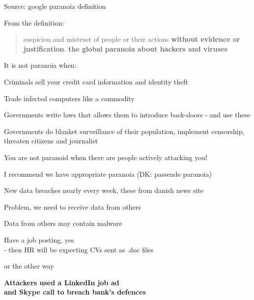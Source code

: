 \documentclass[Screen16to9,17pt]{foils}
\begin{document}


Source: google paranoia definition


From the definition:
\begin{quote}
suspicion and mistrust of people or their actions {\bf without evidence or justification}.
{\bf the global paranoia about hackers and viruses}
\end{quote}

\begin{list1}
\item It is not paranoia when:
\begin{list2}
\item Criminals sell your credit card information and identity theft
\item Trade infected computers like a commodity
\item Governments write laws that allows them to introduce back-doors - and use these
\item Governments do blanket surveillance of their population, implement censorship, threaten citizens and journalist
\end{list2}
\end{list1}

\vskip 1cm
\centerline{You are not paranoid when there are people actively attacking you!}

I recommend we have appropriate paranoia (DK: passende paranoia)



New data breaches nearly every week, these from danish news site 

Problem, we need to receive data from others

Data from others may contain malware

Have a job posting, yes\\
- then HR will be expecting CVs sent as .doc files

\slide{}

or the other way

{\Large\bf Attackers used a LinkedIn job ad\\
and Skype call to breach bank’s defences}

{\footnotesize
{}}
\end{document}
